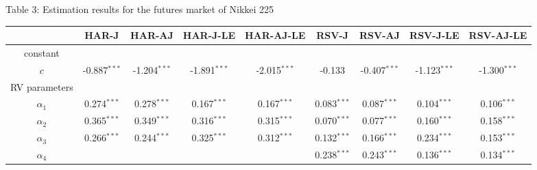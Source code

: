 \documentclass[10pt]{article}
\begin{document}
\newpage
\fontsize{11pt}{14pt}\selectfont
\begin{landscape}
\begin{center}
Table 3: Estimation results for the futures market of Nikkei 225
\end{center}

\begin{center}
\begin{tabular}{c|cccc|cccc} \hline       
                 &HAR-J                         &HAR-AJ                    &HAR-J-LE                     & HAR-AJ-LE                 &RSV-J                          &RSV-AJ                   &RSV-J-LE                       & RSV-AJ-LE           \\ \hline 
constant     &                                   &                                  &                                  &                                   &                                   &                                 &                                   &                              \\
$c$            &-0.887$^{\ast \ast \ast}$&-1.204$^{\ast \ast \ast}$&-1.891$^{\ast \ast \ast}$&-2.015$^{\ast \ast \ast}$&-0.133                         &-0.407$^{\ast \ast \ast}$&-1.123$^{\ast \ast \ast}$&-1.300$^{\ast \ast \ast}$\\
RV parameters&           &           &           &            &            &            &              &                 \\
$\alpha_1$  &0.274$^{\ast \ast \ast}$ &0.278$^{\ast \ast \ast}$&0.167$^{\ast \ast \ast}$   &0.167$^{\ast \ast \ast}$   &0.083$^{\ast \ast \ast}$  &0.087$^{\ast \ast \ast}$& 0.104$^{\ast \ast \ast}$& 0.106$^{\ast \ast \ast}$\\
$\alpha_2$  &0.365$^{\ast \ast \ast}$ &0.349$^{\ast \ast \ast}$&0.316$^{\ast \ast \ast}$   &0.315$^{\ast \ast \ast}$   &0.070$^{\ast \ast \ast}$  &0.077$^{\ast \ast \ast}$& 0.160$^{\ast \ast \ast}$ &0.158$^{\ast \ast \ast}$\\
$\alpha_3$  &0.266$^{\ast \ast \ast}$ &0.244$^{\ast \ast \ast}$&0.325$^{\ast \ast \ast}$   &0.312$^{\ast \ast \ast}$   &0.132$^{\ast \ast \ast}$  &0.166$^{\ast \ast \ast}$& 0.234$^{\ast \ast \ast}$&0.153$^{\ast \ast \ast}$\\  
$\alpha_4$  &                                 &                                  &                                   &                                    &0.238$^{\ast \ast \ast}$  &0.243$^{\ast \ast \ast}$& 0.136$^{\ast \ast \ast}$ &0.134$^{\ast \ast \ast}$\\

\end{tabular}
\end{center}
\end{landscape}
\end{document}
